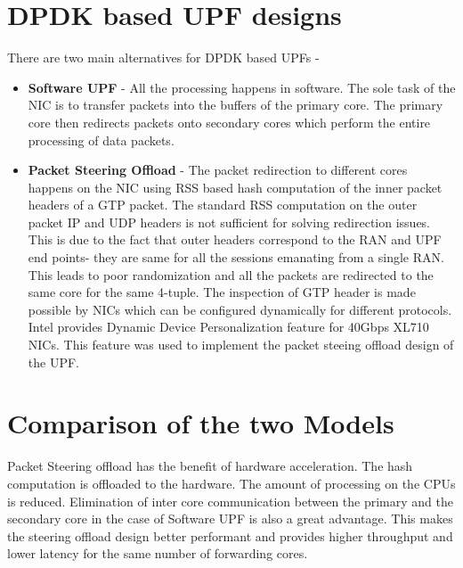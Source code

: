 
\section{DPDK based UPF designs}
There are two main alternatives for DPDK based UPFs -
\begin{itemize}
	\item \textbf{Software UPF} - All the processing happens in software. The sole task of
	      the NIC is to transfer packets into the buffers of the primary core. The primary core then
	      redirects packets onto secondary cores which perform the entire processing of data packets.
	\item \textbf{Packet Steering Offload} - The packet redirection to different cores happens on the NIC using RSS based hash
	      computation of the inner packet headers of a GTP packet. The standard RSS computation on the outer packet IP and UDP headers is not sufficient for solving redirection issues. This is due to the fact that outer headers correspond to the RAN and UPF end points- they are same for all the sessions emanating from a single RAN. This leads to poor randomization and all the packets are redirected to the same core for the same 4-tuple. The inspection of GTP header is made possible by NICs which can be configured dynamically for different protocols. Intel provides Dynamic Device Personalization feature for 40Gbps XL710 NICs. This feature was used to implement the packet steeing offload design of the UPF.
\end{itemize}
\section{Comparison of the two Models}
Packet Steering offload has the benefit of hardware acceleration. The hash computation is offloaded to the hardware. The amount of processing on the CPUs is reduced. Elimination of inter core communication between the primary and the secondary core in the case of Software UPF is also a great advantage. This makes the steering offload design better performant and provides higher throughput and lower latency for the same number of forwarding cores.


